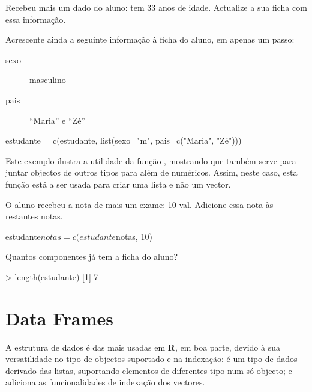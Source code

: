 \documentclass{exam}
\begin{document}
\begin{questions}
\question Recebeu mais um dado do aluno: tem 33 anos de idade. Actualize a sua ficha com essa informação.

\begin{solution}
\end{solution}


\question Acrescente ainda a seguinte informação à ficha do aluno, em apenas um passo:

\begin{description}
\item[sexo] masculino
\item[pais] ``Maria'' e ``Zé''
\end{description}

\begin{solution}
	\begin{rcode}
		estudante = c(estudante, list(sexo="m", pais=c("Maria", "Zé")))
	\end{rcode}
	Este exemplo ilustra a utilidade da função , mostrando que também serve para juntar objectos de outros tipos para além de numéricos. Assim, neste caso, esta função está a ser usada para criar uma lista e não um vector.
\end{solution}

\question O aluno recebeu a nota de mais um exame: 10 val. Adicione essa nota às restantes notas.

\begin{solution}
	\begin{rcode}
		estudante$notas = c(estudante$notas, 10)
	\end{rcode}
\end{solution}

\question Quantos componentes já tem a ficha do aluno?

\begin{solution}
	\begin{rcode}
		> length(estudante)
		[1] 7
	\end{rcode}
\end{solution}

\end{questions}

\section{Data Frames}

A estrutura de dados  é das mais usadas em \textbf{R}, em boa parte, devido à sua versatilidade no tipo de objectos suportado e na indexação: é um tipo de dados derivado das listas, suportando elementos de diferentes tipo num só objecto; e adiciona as funcionalidades de indexação dos vectores. 
\end{document}
